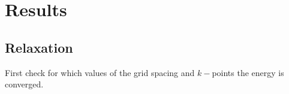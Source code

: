 \chapter{Results}
\section{Relaxation}
First check for which values of the grid spacing and $k-$points the energy is converged.
